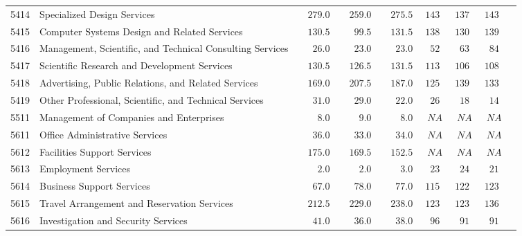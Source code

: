 \documentclass[9pt, oneside]{article}   	%
\begin{document}
\begin{longtable}{lp{3.5 in}ccccccc}
5414  & Specialized Design Services & $\phantom{00}279.0$ & $\phantom{00}259.0$ & $\phantom{00}275.5$ & $143$ & $137$ & $143$ \\
5415  & Computer Systems Design and Related Services & $\phantom{00}130.5$ & $\phantom{000}99.5$ & $\phantom{00}131.5$ & $138$ & $130$ & $139$ \\
5416  & Management, Scientific, and Technical Consulting Services & $\phantom{000}26.0$ & $\phantom{000}23.0$ & $\phantom{000}23.0$ & $\phantom{0}52$ & $\phantom{0}63$ & $\phantom{0}84$ \\
5417  & Scientific Research and Development Services & $\phantom{00}130.5$ & $\phantom{00}126.5$ & $\phantom{00}131.5$ & $113$ & $106$ & $108$ \\
5418  & Advertising, Public Relations, and Related Services & $\phantom{00}169.0$ & $\phantom{00}207.5$ & $\phantom{00}187.0$ & $125$ & $139$ & $133$ \\
5419  & Other Professional, Scientific, and Technical Services & $\phantom{000}31.0$ & $\phantom{000}29.0$ & $\phantom{000}22.0$ & $\phantom{0}26$ & $\phantom{0}18$ & $\phantom{0}14$ \\
5511  & Management of Companies and Enterprises & $\phantom{0000}8.0$ & $\phantom{0000}9.0$ & $\phantom{0000}8.0$ & $\phantom{0}NA$ & $\phantom{0}NA$ & $\phantom{0}NA$ \\
5611  & Office Administrative Services & $\phantom{000}36.0$ & $\phantom{000}33.0$ & $\phantom{000}34.0$ & $\phantom{0}NA$ & $\phantom{0}NA$ & $\phantom{0}NA$ \\
5612  & Facilities Support Services & $\phantom{00}175.0$ & $\phantom{00}169.5$ & $\phantom{00}152.5$ & $\phantom{0}NA$ & $\phantom{0}NA$ & $\phantom{0}NA$ \\
5613  & Employment Services & $\phantom{0000}2.0$ & $\phantom{0000}2.0$ & $\phantom{0000}3.0$ & $\phantom{0}23$ & $\phantom{0}24$ & $\phantom{0}21$ \\
5614  & Business Support Services & $\phantom{000}67.0$ & $\phantom{000}78.0$ & $\phantom{000}77.0$ & $115$ & $122$ & $123$ \\
5615  & Travel Arrangement and Reservation Services & $\phantom{00}212.5$ & $\phantom{00}229.0$ & $\phantom{00}238.0$ & $123$ & $123$ & $136$ \\
5616  & Investigation and Security Services & $\phantom{000}41.0$ & $\phantom{000}36.0$ & $\phantom{000}38.0$ & $\phantom{0}96$ & $\phantom{0}91$ & $\phantom{0}91$ \\

\end{longtable}
\end{document}
